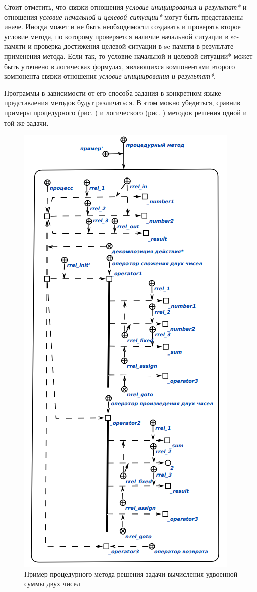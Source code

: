Стоит отметить, что связки отношения \textit{условие инициирования и результат*} и отношения \textit{условие начальной и целевой ситуации*} могут быть представлены иначе. Иногда может и не быть необходимости создавать и проверять второе условие метода, по которому проверяется наличие начальной ситуации в sc-памяти и проверка достижения целевой ситуации в sc-памяти в результате применения метода. Если так, то условие начальной и целевой ситуации* может быть уточнено в логическах формулах, являющихся компонентами второго компонента связки отношения \textit{условие инициирования и результат*}.

Программы в зависимости от его способа задания в конкретном языке представления методов будут различаться. В этом можно убедиться, сравнив примеры процедурного (рис. ) и логического (рис. ) методов решения одной и той же задачи.

\begin{figure}[htbp]  
  \center
  \includegraphics[scale=0.6]{author/part3/figures/procedural_program.png}
  \caption{Пример процедурного метода решения задачи вычисления удвоенной суммы двух чисел}
  \label{fig:procedural_program}
\end{figure}

